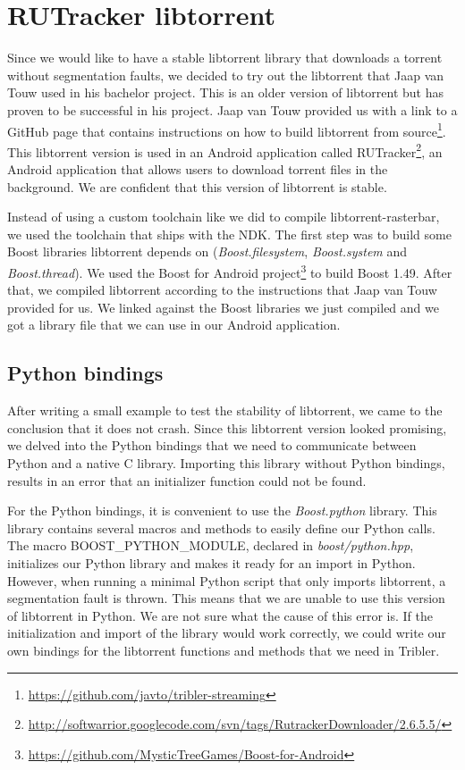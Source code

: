 	\section{RUTracker libtorrent}
		Since we would like to have a stable libtorrent library that downloads a torrent without segmentation faults, we decided to try out the libtorrent that Jaap van Touw used in his bachelor project. This is an older version of libtorrent but has proven to be successful in his project. Jaap van Touw provided us with a link to a GitHub page that contains instructions on how to build libtorrent from source\footnote{\url{https://github.com/javto/tribler-streaming}}. This libtorrent version is used in an Android application called RUTracker\footnote{\url{http://softwarrior.googlecode.com/svn/tags/RutrackerDownloader/2.6.5.5/}}, an Android application that allows users to download torrent files in the background. We are confident that this version of libtorrent is stable.
		
		Instead of using a custom toolchain like we did to compile libtorrent-rasterbar, we used the toolchain that ships with the NDK. The first step was to build some Boost libraries libtorrent depends on (\emph{Boost.filesystem}, \emph{Boost.system} and \emph{Boost.thread}). We used the Boost for Android project\footnote{\url{https://github.com/MysticTreeGames/Boost-for-Android}} to build Boost 1.49. After that, we compiled libtorrent according to the instructions that Jaap van Touw provided for us. We linked against the Boost libraries we just compiled and we got a library file that we can use in our Android application.
		
		\subsection{Python bindings}
			After writing a small example to test the stability of libtorrent, we came to the conclusion that it does not crash. Since this libtorrent version looked promising, we delved into the Python bindings that we need to communicate between Python and a native C library. Importing this library without Python bindings, results in an error that an initializer function could not be found.
		
			For the Python bindings, it is convenient to use the \emph{Boost.python} library. This library contains several macros and methods to easily define our Python calls. The macro \newline BOOST\_PYTHON\_MODULE, declared in \emph{boost/python.hpp}, initializes our Python library and makes it ready for an import in Python. However, when running a minimal Python script that only imports libtorrent, a segmentation fault is thrown. This means that we are unable to use this version of libtorrent in Python. We are not sure what the cause of this error is. If the initialization and import of the library would work correctly, we could write our own bindings for the libtorrent functions and methods that we need in Tribler.
			
